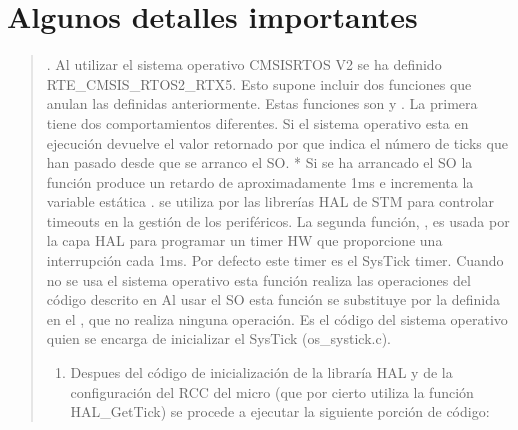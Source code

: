 \documentclass[letterpaper,10pt,english]{sphinxmanual}
\begin{document}
\section{Algunos detalles importantes}
\label{\detokenize{cmsis-rtos:algunos-detalles-importantes}}\begin{quote}

. Al utilizar el sistema operativo CMSIS\sphinxhyphen{}RTOS V2 se ha definido RTE\_CMSIS\_RTOS2\_RTX5. Esto supone incluir dos funciones que anulan las definidas anteriormente.
Estas funciones son    y . La primera tiene dos comportamientos diferentes. Si el sistema operativo esta en ejecución devuelve el valor retornado por  que indica el número de ticks que han pasado desde que se arranco el SO.     * Si  se ha arrancado el SO la función produce un retardo de aproximadamente 1ms e incrementa la variable estática .
 se utiliza por las librerías HAL de STM para controlar timeouts en la gestión de los periféricos. La segunda función, , es usada por la capa HAL para programar un timer HW que proporcione una interrupción cada 1ms. Por defecto este timer es el SysTick timer.
Cuando no se usa el sistema operativo esta función realiza las operaciones del código descrito en  Al usar el SO esta función se substituye por la definida en el , que no realiza ninguna operación.
Es el código del sistema operativo quien se encarga de inicializar el SysTick (os\_systick.c).
\begin{enumerate}
%
\setcounter{enumi}{1}
\item {} 
\sphinxAtStartPar
Despues del código de inicialización de la libraría HAL y de la configuración del RCC del micro (que por cierto utiliza la función HAL\_GetTick) se procede a ejecutar la siguiente porción de código:

\end{enumerate}

\begin{sphinxVerbatim}[commandchars=\\\{\},numbers=left,firstnumber=1,stepnumber=1]


\end{sphinxVerbatim}
\end{quote}
\end{document}

